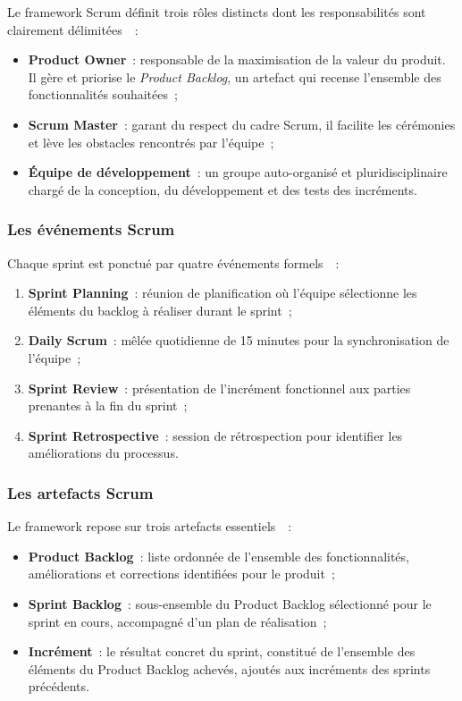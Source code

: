 Le framework Scrum définit trois rôles distincts dont les responsabilités sont clairement délimitées~\cite{schwaber2020}~:

\begin{itemize}[noitemsep]
    \item \textbf{Product Owner}~: responsable de la maximisation de la valeur du produit. Il gère et priorise le \textit{Product Backlog}, un artefact qui recense l'ensemble des fonctionnalités souhaitées~;
    \item \textbf{Scrum Master}~: garant du respect du cadre Scrum, il facilite les cérémonies et lève les obstacles rencontrés par l'équipe~;
    \item \textbf{Équipe de développement}~: un groupe auto-organisé et pluridisciplinaire chargé de la conception, du développement et des tests des incréments.
\end{itemize}

\subsubsection{Les événements Scrum}

Chaque sprint est ponctué par quatre événements formels~\cite{schwaber2020}~:

\begin{enumerate}[noitemsep]
    \item \textbf{Sprint Planning}~: réunion de planification où l'équipe sélectionne les éléments du backlog à réaliser durant le sprint~;
    \item \textbf{Daily Scrum}~: mêlée quotidienne de 15 minutes pour la synchronisation de l'équipe~;
    \item \textbf{Sprint Review}~: présentation de l'incrément fonctionnel aux parties prenantes à la fin du sprint~;
    \item \textbf{Sprint Retrospective}~: session de rétrospection pour identifier les améliorations du processus.
\end{enumerate}

\subsubsection{Les artefacts Scrum}

Le framework repose sur trois artefacts essentiels~\cite{rubin2012}~:

\begin{itemize}[noitemsep]
    \item \textbf{Product Backlog}~: liste ordonnée de l'ensemble des fonctionnalités, améliorations et corrections identifiées pour le produit~;
    \item \textbf{Sprint Backlog}~: sous-ensemble du Product Backlog sélectionné pour le sprint en cours, accompagné d'un plan de réalisation~;
    \item \textbf{Incrément}~: le résultat concret du sprint, constitué de l'ensemble des éléments du Product Backlog achevés, ajoutés aux incréments des sprints précédents.
\end{itemize}


